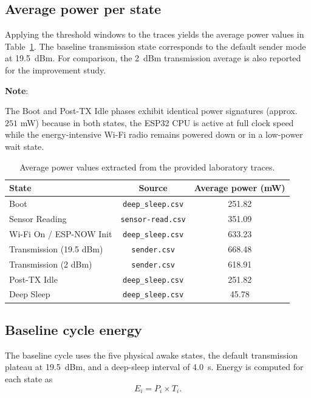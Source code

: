 \documentclass[11pt,a4paper]{article}
\begin{document}
\subsection{Average power per state}
Applying the threshold windows to the traces yields the average power values in Table~\ref{tab:power}. The baseline transmission state corresponds to the default sender mode at \SI{19.5}{dBm}. For comparison, the \SI{2}{dBm} transmission average is also reported for the improvement study.

\textbf{Note}: 

The Boot and Post-TX Idle phases exhibit identical power signatures (approx. $251$ mW) because in both states, the ESP32 CPU is active at full clock speed while the energy-intensive Wi-Fi radio remains powered down or in a low-power wait state.
\begin{table}[H]
\centering
\caption{Average power values extracted from the provided laboratory traces.}
\label{tab:power}
\begin{tabular}{lcc}
\toprule
State & Source & Average power (mW) \\
\midrule
Boot & \texttt{deep\_sleep.csv} & 251.82 \\
Sensor Reading & \texttt{sensor-read.csv} & 351.09 \\
Wi-Fi On / ESP-NOW Init & \texttt{deep\_sleep.csv} & 633.23 \\
Transmission (19.5 dBm) & \texttt{sender.csv} & 668.48 \\
Transmission (2 dBm) & \texttt{sender.csv} & 618.91 \\
Post-TX Idle & \texttt{deep\_sleep.csv} & 251.82 \\
Deep Sleep & \texttt{deep\_sleep.csv} & 45.78 \\
\bottomrule
\end{tabular}
\end{table}

\subsection{Baseline cycle energy}
The baseline cycle uses the five physical awake states, the default transmission plateau at \SI{19.5}{dBm}, and a deep-sleep interval of \SI{4.0}{s}. Energy is computed for each state as
\[
E_i = P_i \times T_i.
\]
\end{document}
